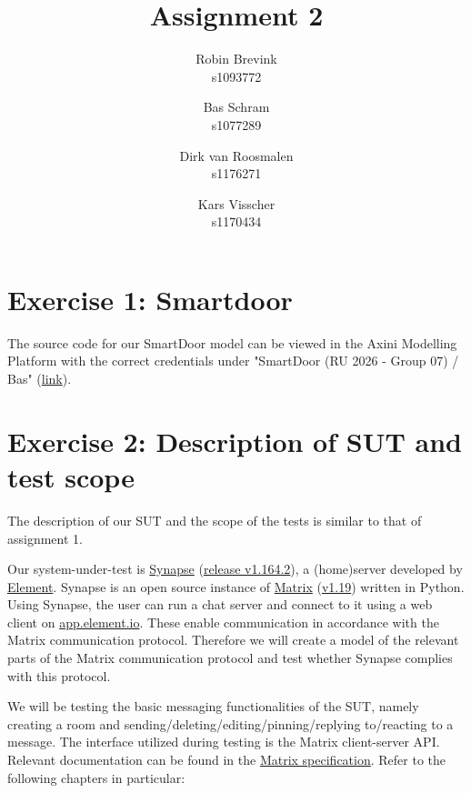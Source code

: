 \documentclass[a4paper]{article}
\begin{document}
\title{Assignment 2}	
\author{
	Robin Brevink \\
	\small s1093772
	\and
	Bas Schram \\
	\small s1077289
	\and
	Dirk van Roosmalen \\
	\small s1176271
	\and
	Kars Visscher \\
	\small s1170434
}

\maketitle

\section{Exercise 1: Smartdoor} \label{exercise-1-smartdoor}
The source code for our SmartDoor model can be viewed in the Axini Modelling Platform with the correct credentials under "SmartDoor (RU 2026 - Group 07) / Bas" (\href{https://course02.axini.com/test\_sets/a788cad7-e103-4c0c-92e6-b1ebfb27e557/model}{link}).

\section{Exercise 2: Description of SUT and test scope} \label{exercise-2-description-of-sut-and-test-scope}
The description of our SUT and the scope of the tests is similar to that of assignment 1.

Our system-under-test is \href{https://github.com/element-hq/synapse}{Synapse} (\href{https://github.com/element-hq/synapse/releases/tag/v1.164.2}{release v1.164.2}), a (home)server developed by \href{https://element.io/}{Element}. Synapse is an open source instance of \href{https://matrix.org/}{Matrix} (\href{https://spec.matrix.org/v1.19/}{v1.19}) written in Python. Using Synapse, the user can run a chat server and connect to it using a web client on \href{https://app.element.io/}{app.element.io}. These enable communication in accordance with the Matrix communication protocol. Therefore we will create a model of the relevant parts of the Matrix communication protocol and test whether Synapse complies with this protocol.

We will be testing the basic messaging functionalities of the SUT, namely creating a room and sending/deleting/editing/pinning/replying to/reacting to a message. The interface utilized during testing is the Matrix client-server API. Relevant documentation can be found in the \href{https://spec.matrix.org/v1.19/client-server-api/}{Matrix specification}. Refer to the following chapters in particular:
\end{document}
